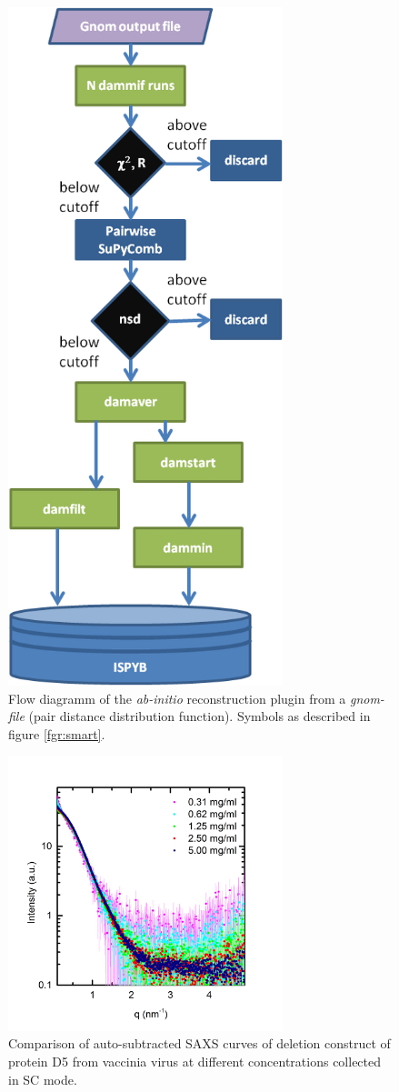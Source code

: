 \documentclass[preprint,pdf]{iucr}              %
\begin{document}
\begin{figure}
\centering
\includegraphics[width=8cm]{model.png}
\caption{Flow diagramm of the \textit{ab-initio} reconstruction plugin from a
\textit{gnom-file} (pair distance distribution function).
Symbols as described in figure \ref{fgr:smart}.}
\label{fgr:modeling}
\end{figure}

\begin{figure}
\centering
\includegraphics[width=8cm]{SCcurves.png}
\caption{Comparison of auto-subtracted SAXS curves of deletion construct of
protein D5 from vaccinia virus at different concentrations collected in SC mode.}
\label{fgr:SCcurves}
\end{figure}
\end{document}
